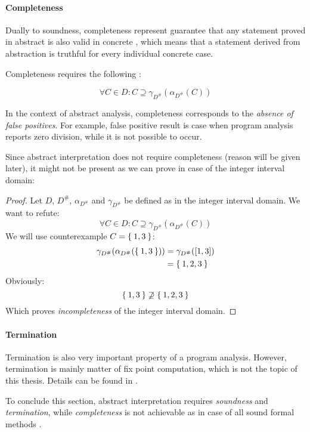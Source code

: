 \documentclass[12pt,oneside]{fithesis2}
\theoremstyle{definition}
\begin{document}
\paragraph{Completeness}
Dually to soundness, completeness represent guarantee that any statement proved in abstract is also valid in concrete \cite{mine-AIAA10}, which means that a statement derived from abstraction is truthful for every individual concrete case.

Completeness requires the following \cite{mine-AIAA10}:

\[
  \forall C \in D: C \supseteq \gamma_{D^\#}(\alpha_{D^\#}(C))
\]

In the context of abstract analysis, completeness corresponds to the \textit{absence of false positives}. For example, false positive result is case when program analysis reports zero division, while it is not possible to occur.

Since abstract interpretation does not require completeness (reason will be given later), it might not be present as we can prove in case of the integer interval domain:

\begin{proof}
  Let $D$, $D^\#$, $\alpha_{D^\#}$ and $\gamma_{D^\#}$ be defined as in the integer interval domain. We want to refute:
  \[
    \forall C \in D: C \supseteq \gamma_{D^\#}(\alpha_{D^\#}(C))
  \]
  We will use counterexample $C = \Set{1, 3}$:
  \begin{align*}
    \gamma_{D^\#}(\alpha_{D^\#}(\Set{1, 3})) &= \gamma_{D^\#}([1, 3])\\
    &= \Set{1, 2, 3}
  \end{align*}
  Obviously:
  \[
    \Set{1, 3} \not\supseteq \Set{1, 2, 3}
  \]
  Which proves \textit{incompleteness} of the integer interval domain.
\end{proof}

\paragraph{Termination} Termination is also very important property of a program analysis. However, termination is mainly matter of fix point computation, which is not the topic of this thesis. Details can be found in \cite{CousotCousot79-1}.

To conclude this section, abstract interpretation requires \textit{soundness} and \textit{termination}, while \textit{completeness} is not achievable as in case of all sound formal methods \cite{CousotEtAl06-ASIAN}.
\end{document}
